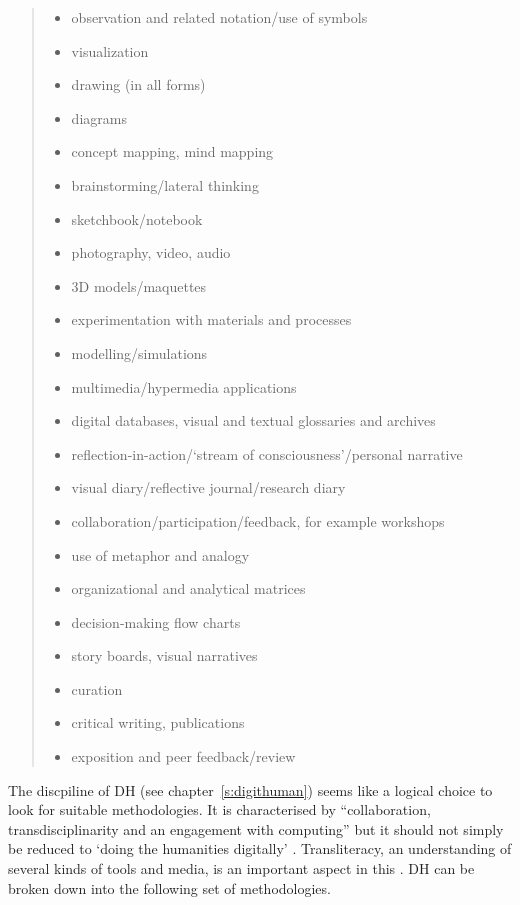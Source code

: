 \documentclass[11pt]{thesis} %
\begin{document}
\begin{quotation}
\begin{itemize}
  \item observation and related notation/use of symbols
  \item visualization
  \item drawing (in all forms)
  \item diagrams
  \item concept mapping, mind mapping
  \item brainstorming/lateral thinking
  \item sketchbook/notebook
  \item photography, video, audio
  \item 3D models/maquettes
  \item experimentation with materials and processes
  \item modelling/simulations
  \item multimedia/hypermedia applications
  \item digital databases, visual and textual glossaries and archives
  \item reflection-in-action/`stream of consciousness'/personal narrative
  \item visual diary/reflective journal/research diary
  \item collaboration/participation/feedback, for example workshops
  \item use of metaphor and analogy
  \item organizational and analytical matrices
  \item decision-making flow charts
  \item story boards, visual narratives
  \item curation
  \item critical writing, publications
  \item exposition and peer feedback/review
\end{itemize}
\end{quotation}

The discpiline of \ac{DH} (see chapter~\ref{s:digithuman}) seems like a logical choice to look for suitable methodologies. It is characterised by ``collaboration, transdisciplinarity and an engagement with computing'' \autocite{Burdick2012} but it should not simply be reduced to `doing the humanities digitally' \autocite{Burdick2012}. Transliteracy, an understanding of several kinds of tools and media, is an important aspect in this \autocite{Thomas2007}. \ac{DH} can be broken down into the following set of methodologies.
\end{document}
